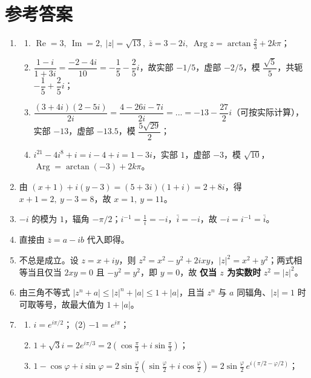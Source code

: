 \section{参考答案}\label{ux53c2ux8003ux7b54ux6848}

\begin{enumerate}
\def\labelenumi{\arabic{enumi}.}
\item
  \begin{enumerate}
  \def\labelenumii{(\arabic{enumii})}
  \tightlist
  \item
    \(\operatorname{Re}=3,\ \operatorname{Im}=2,\ |z|=\sqrt{13},\ \bar z=3-2i,\ \operatorname{Arg}z=\arctan\frac{2}{3}+2k\pi\)；
  \item
    \(\dfrac{1-i}{1+3i}=\dfrac{-2-4i}{10}=-\dfrac15-\dfrac25i\)，故实部
    \(-1/5\)，虚部 \(-2/5\)，模 \(\dfrac{\sqrt5}{5}\)，共轭
    \(-\dfrac15+\dfrac25i\)；
  \item
    \(\dfrac{(3+4i)(2-5i)}{2i}=\dfrac{4-26i-7i}{2i}=...=-13-\dfrac{27}{2}i\)（可按实际计算），实部
    \(-13\)，虚部 \(-13.5\)，模 \(\dfrac{5\sqrt{29}}{2}\)；
  \item
    \(i^{21}-4i^8+i=i-4+i=1-3i\)，实部 \(1\)，虚部 \(-3\)，模
    \(\sqrt{10}\)，\(\operatorname{Arg}=\arctan(-3)+2k\pi\)。
  \end{enumerate}
\item
  由 \((x+1)+i(y-3)=(5+3i)(1+i)=2+8i\)，得 \(x+1=2,\ y-3=8\)，故
  \(x=1,\ y=11\)。
\item
  \(-i\) 的模为 \(1\)，辐角
  \(-\pi/2\)；\(i^{-1}=\frac1i=-i\)，\(\bar i=-i\)，故
  \(-i=i^{-1}=\bar i\)。
\item
  直接由 \(\bar z=a-ib\) 代入即得。
\item
  不总是成立。设 \(z=x+iy\)，则
  \(z^2=x^2-y^2+2ixy\)，\(|z|^2=x^2+y^2\)；两式相等当且仅当 \(2xy=0\) 且
  \(-y^2=y^2\)，即 \(y=0\)，故 \textbf{仅当 \(z\) 为实数时}
  \(z^2=|z|^2\)。
\item
  由三角不等式 \(|z^n+a|\le|z|^n+|a|\le 1+|a|\)，且当 \(z^n\) 与 \(a\)
  同辐角、\(|z|=1\) 时可取等号，故最大值为 \(1+|a|\)。
\item
  \begin{enumerate}
  \def\labelenumii{(\arabic{enumii})}
  \tightlist
  \item
    \(i=e^{i\pi/2}\)； (2) \(-1=e^{i\pi}\)；
  \item
    \(1+\sqrt3 i=2e^{i\pi/3}=2(\cos\frac{\pi}{3}+i\sin\frac{\pi}{3})\)；
  \item
    \(1-\cos\varphi+i\sin\varphi=2\sin\frac{\varphi}{2}\left(\sin\frac{\varphi}{2}+i\cos\frac{\varphi}{2}\right)=2\sin\frac{\varphi}{2}\,e^{i(\pi/2-\varphi/2)}\)；

\end{enumerate}
\end{enumerate}
